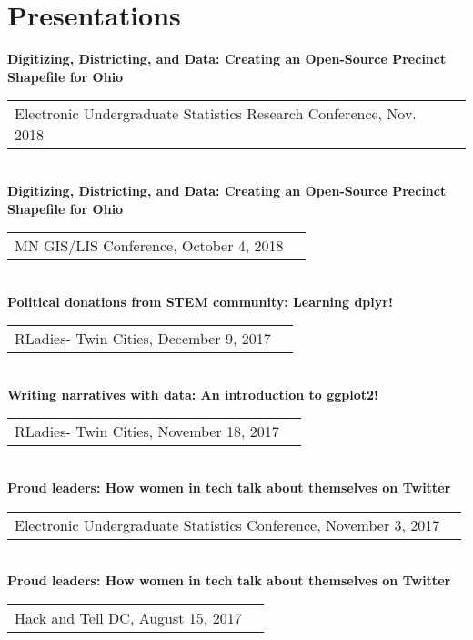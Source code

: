 \section{\sc Presentations}
{\bf{Digitizing, Districting, and Data: Creating an Open-Source Precinct \\Shapefile for Ohio}}\\
\begin{tabular}{@{}p{4in}p{2in}}
Electronic Undergraduate Statistics Research Conference, Nov. 2018\\
\end{tabular} \\
{\bf{Digitizing, Districting, and Data: Creating an Open-Source Precinct \\Shapefile for Ohio}}\\
\begin{tabular}{@{}p{4in}p{2in}}
MN GIS/LIS Conference, October 4, 2018\\
\end{tabular} \\
{\bf{Political donations from STEM community: Learning dplyr!}}\\
\begin{tabular}{@{}p{4in}p{2in}}
RLadies- Twin Cities, December 9, 2017\\
\end{tabular} \\
{\bf{Writing narratives with data: An introduction to ggplot2!}}\\
\begin{tabular}{@{}p{4in}p{2in}}
RLadies- Twin Cities, November 18, 2017\\
\end{tabular} \\
{\bf{Proud leaders: How women in tech talk about themselves on Twitter}}\\
\begin{tabular}{@{}p{4in}p{2in}}
Electronic Undergraduate Statistics Conference, November 3, 2017\\
\end{tabular} \\
{\bf{Proud leaders: How women in tech talk about themselves on Twitter}}\\
\begin{tabular}{@{}p{4in}p{2in}}
Hack and Tell DC, August 15, 2017\\
\end{tabular}
\endinput